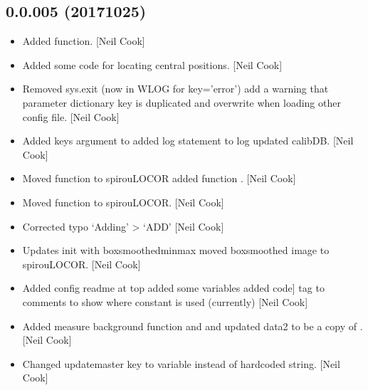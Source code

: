\documentclass[a4paper,10pt,english]{report}
\begin{document}
\subsection{0.0.005 (2017\sphinxhyphen{}10\sphinxhyphen{}25)}
\label{\detokenize{misc/changelog:id565}}\begin{itemize}
\item {} 
Added  function. {[}Neil Cook{]}

\item {} 
Added some code for locating central positions. {[}Neil Cook{]}

\item {} 
Removed sys.exit (now in WLOG for key=’error’) add a warning that
parameter dictionary key is duplicated and overwrite when loading
other config file. {[}Neil Cook{]}

\item {} 
Added keys argument to  added log statement to log
updated calibDB. {[}Neil Cook{]}

\item {} 
Moved  function to spirouLOCOR added function
. {[}Neil Cook{]}

\item {} 
Moved  function to spirouLOCOR. {[}Neil Cook{]}

\item {} 
Corrected typo ‘Adding’ \textendash{}\textgreater{} ‘ADD’ {[}Neil Cook{]}

\item {} 
Updates init with boxsmoothedminmax moved boxsmoothed image to
spirouLOCOR. {[}Neil Cook{]}

\item {} 
Added config readme at top added some  variables added \sphinxhyphen{}{[}code{]}
tag to comments to show where constant is used (currently) {[}Neil Cook{]}

\item {} 
Added measure background function and  and
 updated data2 to be a copy of
. {[}Neil Cook{]}

\item {} 
Changed updatemaster key to variable instead of hardcoded string.
{[}Neil Cook{]}


\end{itemize}
\end{document}
